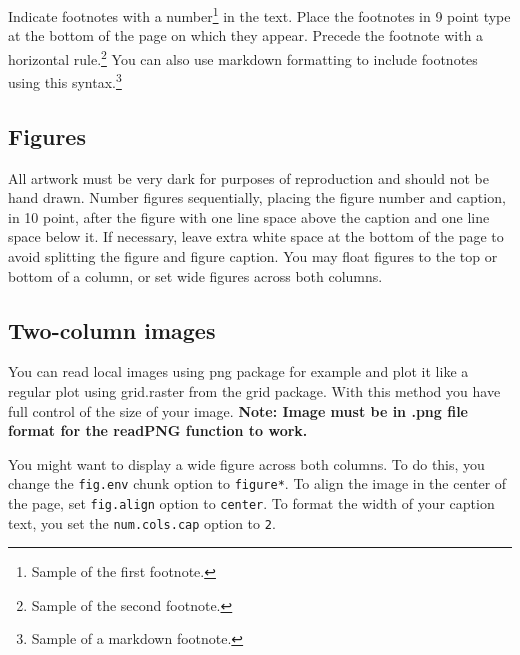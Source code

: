 \documentclass[10pt, letterpaper]{article}
\begin{document}
Indicate footnotes with a number\footnote{Sample of the first
footnote.} in the text. Place the footnotes in 9 point type at the
bottom of the page on which they appear. Precede the footnote with a
horizontal rule.\footnote{Sample of the second footnote.} You can also
use markdown formatting to include footnotes using this
syntax.\footnote{Sample of a markdown footnote.}

\hypertarget{figures}{%
\subsection{Figures}\label{figures}}

All artwork must be very dark for purposes of reproduction and should
not be hand drawn. Number figures sequentially, placing the figure
number and caption, in 10 point, after the figure with one line space
above the caption and one line space below it. If necessary, leave extra
white space at the bottom of the page to avoid splitting the figure and
figure caption. You may float figures to the top or bottom of a column,
or set wide figures across both columns.

\hypertarget{two-column-images}{%
\subsection{Two-column images}\label{two-column-images}}

You can read local images using png package for example and plot it like
a regular plot using grid.raster from the grid package. With this method
you have full control of the size of your image. \textbf{Note: Image
must be in .png file format for the readPNG function to work.}

You might want to display a wide figure across both columns. To do this,
you change the \texttt{fig.env} chunk option to \texttt{figure*}. To
align the image in the center of the page, set \texttt{fig.align} option
to \texttt{center}. To format the width of your caption text, you set
the \texttt{num.cols.cap} option to \texttt{2}.
\end{document}
